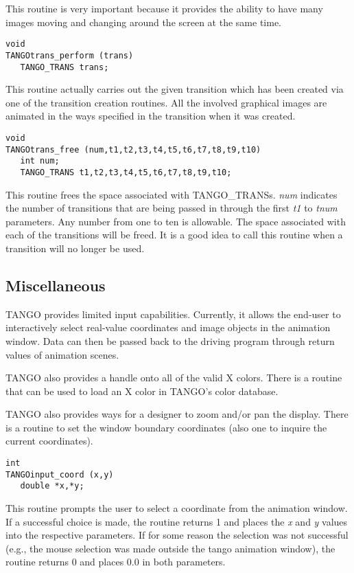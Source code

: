 This routine is very important because it provides the ability to have many
images moving and changing around the screen at the same time.

\vspace{1em}
\begin{verbatim}
void
TANGOtrans_perform (trans) 
   TANGO_TRANS trans;
\end{verbatim}
This routine actually carries out the given transition which has been created
via one of the transition creation routines.  All the involved graphical
images are animated in the ways specified in the transition when it was
created.

\vspace{1em}
\begin{verbatim}
void
TANGOtrans_free (num,t1,t2,t3,t4,t5,t6,t7,t8,t9,t10) 
   int num;
   TANGO_TRANS t1,t2,t3,t4,t5,t6,t7,t8,t9,t10;
\end{verbatim}
This routine frees the space associated with TANGO\_TRANSs.  {\em num}
indicates the number of transitions that are being passed in through the first
{\em t1} to {\em tnum} parameters.  Any number from one to ten is allowable.
The space associated with each of the transitions will be freed. It is a good
idea to call this routine when a transition will no longer be used.

\subsection{Miscellaneous} 
TANGO provides limited input
capabilities.  Currently, it allows the end-user to interactively
select real-value coordinates and image objects in the animation
window.  Data can then be passed back to the driving program through
return values of animation scenes.

TANGO also provides a handle onto all of the valid X colors.  There is
a routine that can be used to load an X color in TANGO's color
database.

TANGO also provides ways for a designer to zoom and/or pan the
display.  There is a routine to set the window boundary coordinates
(also one to inquire the current coordinates).

\vspace{1em}
\begin{verbatim}
int
TANGOinput_coord (x,y) 
   double *x,*y;
\end{verbatim}
This routine prompts the user to select a coordinate from the animation
window.  If a successful choice is made, the routine returns 1 and places the
{\em x} and {\em y} values into the respective parameters.  If for some reason
the selection was not successful (e.g., the mouse selection was made
outside the tango animation window), the routine returns 0 and places 0.0
in both parameters.

